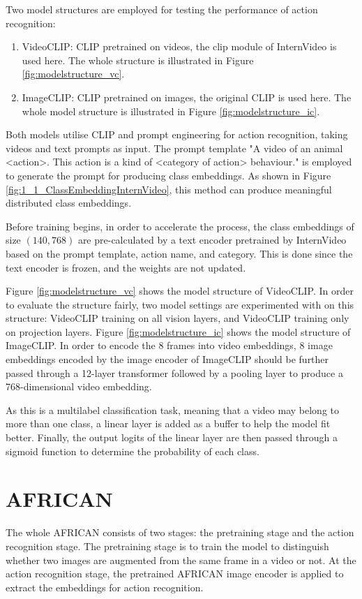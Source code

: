 Two model structures are employed for testing the performance of action recognition: 
\begin{enumerate}
    \item VideoCLIP: CLIP pretrained on videos, the clip module of InternVideo \parencite{wang2022internvideo} is used here. The whole structure is illustrated in Figure \ref{fig:modelstructure_vc}.
    \item ImageCLIP: CLIP pretrained on images, the original CLIP \parencite{radford2021learning} is used here. The whole model structure is illustrated in Figure \ref{fig:modelstructure_ic}.
\end{enumerate}

Both models utilise CLIP and prompt engineering for action recognition, taking videos and text prompts as input. The prompt template "A video of an animal
<action>. This action is a kind of <category of action> behaviour." is employed to generate the prompt for producing class embeddings. As shown in Figure \ref{fig:1_1_ClassEmbeddingInternVideo}, this method can produce meaningful distributed class embeddings.

Before training begins, in order to accelerate the process, the class embeddings of size $(140, 768)$ are pre-calculated by a text encoder pretrained by InternVideo based on the prompt template, action name, and category. This is done since the text encoder is frozen, and the weights are not updated. 

Figure \ref{fig:modelstructure_vc} shows the model structure of VideoCLIP. In order to evaluate the structure fairly, two model settings are experimented with on this structure: VideoCLIP training on all vision layers, and VideoCLIP training only on projection layers. Figure \ref{fig:modelstructure_ic} shows the model structure of ImageCLIP. In order to encode the 8 frames into video embeddings, 8 image embeddings encoded by the image encoder of ImageCLIP should be further passed through a 12-layer transformer followed by a pooling layer to produce a 768-dimensional video embedding.

As this is a multilabel classification task, meaning that a video may belong to more than one class, a linear layer is added as a buffer to help the model fit better. Finally, the output logits of the linear layer are then passed through a sigmoid function to determine the probability of each class. 

\section{AFRICAN}
The whole AFRICAN consists of two stages: the pretraining stage and the action recognition stage. The pretraining stage is to train the model to distinguish whether two images are augmented from the same frame in a video or not. At the action recognition stage, the pretrained AFRICAN image encoder is applied to extract the embeddings for action recognition. 

